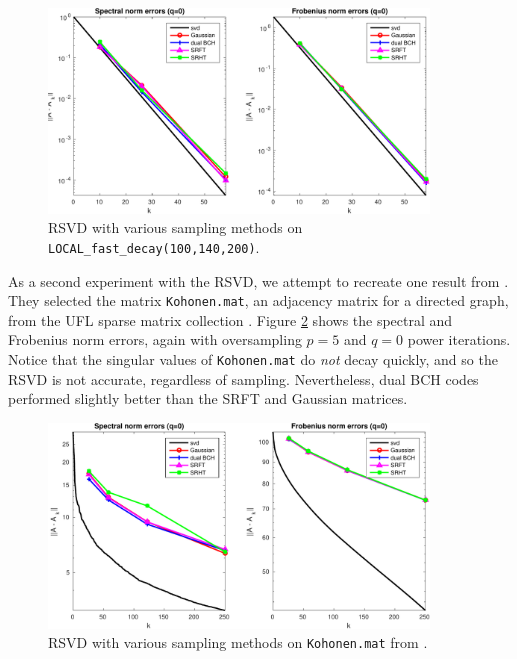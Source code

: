 \documentclass[12pt]{article}
\begin{document}
\begin{figure}[h!]
   \centering
   \includegraphics[width=0.9\textwidth]{figures/fast_decay_rsvd_compare_trim.pdf}
   \caption{RSVD with various sampling methods on \texttt{LOCAL\_fast\_decay(100,140,200)}.}
   \label{fig:rsvd_compare_fast}
\end{figure}

As a second experiment with the RSVD, we attempt to recreate one result from \cite{ubaru2015low}.  They selected the matrix \texttt{Kohonen.mat}, an adjacency matrix for a directed graph, from the UFL sparse matrix collection \cite{ufl_smc}.  Figure \ref{fig:rsvd_compare_kohonen} shows the spectral and Frobenius norm errors, again with oversampling $p=5$ and $q=0$ power iterations.  Notice that the singular values of \texttt{Kohonen.mat} do \emph{not} decay quickly, and so the RSVD is not accurate, regardless of sampling.  Nevertheless, dual BCH codes performed slightly better than the SRFT and Gaussian matrices.

\begin{figure}[h!]
   \centering
   \includegraphics[width=0.9\textwidth]{figures/kohonen_rsvd_compare_trim.pdf}
   \caption{RSVD with various sampling methods on \texttt{Kohonen.mat} from \cite{ufl_smc}.}
   \label{fig:rsvd_compare_kohonen}
\end{figure}
\end{document}
